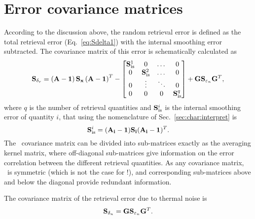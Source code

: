 \section{Error covariance matrices}
\label{sec:Sreterr}
%
According to the discussion above, the random retrieval error is defined as the
total retrieval error (Eq.~\ref{eq:Sdelta1}) with the internal smoothing error
subtracted. The covariance matrix of this error is schematically calculated as
\begin{equation}
  \label{eq:Sdeltar}
  \mathbf{S}_{\delta_r} = \left(\mathbf{A}-\mathbf{1}\right)\mathbf{S}_{\mathbf{x}}
  \left(\mathbf{A}-\mathbf{1}\right)^T -
  \begin{bmatrix}
  \mathbf{S}_\mathrm{is}^1 & 0 & \dots & 0 \\
  0 & \mathbf{S}_\mathrm{is}^2 & \dots & 0 \\
  0 & \vdots & \ddots & 0 \\
  0 & 0 & 0 &  \mathbf{S}_\mathrm{is}^q
  \end{bmatrix} 
  + \mathbf{G}\mathbf{S}_{\varepsilon_n}\mathbf{G}^T,
\end{equation}
where $q$ is the number of retrieval quantities and $\mathbf{S}_\mathrm{is}^i$ is
the internal smoothing error of quantity $i$, that using the nomenclature of
Sec.~\ref{sec:char:interpret} is
\begin{displaymath}
  \mathbf{S}_\mathrm{is}^i = (\mathbf{A}_{\mathbf{i}}-\mathbf{1})\mathbf{S}_{\mathbf{i}}
(\mathbf{A}_{\mathbf{i}}-\mathbf{1})^T.
\end{displaymath}
The \ covariance matrix can be divided into sub-matrices
exactly as the averaging kernel matrix, where off-diagonal sub-matrices give
information on the error correlation between the different retrieval
quantities. As any covariance matrix, \ is symmetric (which
is not the case for \AvrKrnMtr!), and corresponding sub-matrices above and
below the diagonal provide redundant information.

The covariance matrix of the retrieval error due to thermal
noise is
\begin{equation}
  \label{eq:Sdeltan}
  \mathbf{S}_{\delta_n} = \mathbf{G}\mathbf{S}_{\varepsilon_n}\mathbf{G}^T.
\end{equation}

